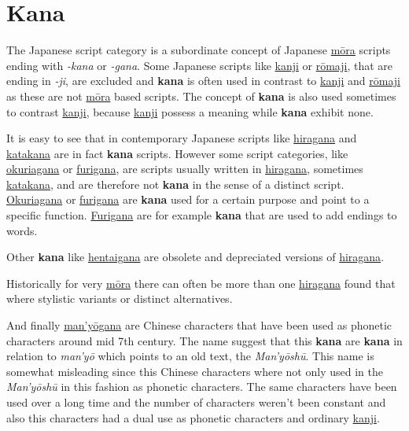 \section{Kana}
\label{sec:Kana}


The Japanese script category \lkana{} is a subordinate concept of Japanese
\hyperref[sec:Mora]{mōra} scripts ending with \textit{-kana} or \textit{-gana}.
Some Japanese scripts like \hyperref[sec:Kanji]{kanji} or
\hyperref[sec:Romaji]{rōmaji}, that are ending in \textit{-ji}, are excluded
and \textbf{kana} is often used in contrast to \hyperref[sec:Kanji]{kanji} and
\hyperref[sec:Romaji]{rōmaji} as these are not \hyperref[sec:Mora]{mōra} based
scripts. The concept of \textbf{kana} is also used sometimes to contrast
\hyperref[sec:Kanji]{kanji}, because \hyperref[sec:Kanji]{kanji} possess a
meaning while \textbf{kana} exhibit none.

It is easy to see that in contemporary Japanese scripts like
\hyperref[sec:Hiragana]{hiragana} and \hyperref[sec:Katakana]{katakana} are in
fact \textbf{kana} scripts. However some script categories, like
\hyperref[sec:Okurigana]{okuriagana} or \hyperref[sec:Furigana]{furigana}, are
scripts usually written in \hyperref[sec:Hiragana]{hiragana}, sometimes
\hyperref[sec:Katakana]{katakana}, and are therefore not \textbf{kana} in the
sense of a distinct script. \hyperref[sec:Okurigana]{Okuriagana} or
\hyperref[sec:Furigana]{furigana} are \textbf{kana} used for a certain purpose
and point to a specific function. \hyperref[sec:Furigana]{Furigana} are for
example \textbf{kana} that are used to add endings to words.

Other \textbf{kana} like \hyperref[sec:Hentaigana]{hentaigana} are obsolete and
depreciated versions of \hyperref[sec:Hiragana]{hiragana}.

Historically for very \hyperref[sec:Mora]{mōra} there can often be more than
one \hyperref[sec:Hiragana]{hiragana} found that where stylistic variants or
distinct alternatives.

And finally \hyperref[sec:Manyogana]{man'yōgana} are Chinese characters that
have been used as phonetic characters around mid 7th century. The name suggest
that this \textbf{kana} are \textbf{kana} in relation to \textit{man'yō} which
points to an old text, the \textit{Man'yōshū}. This name is somewhat misleading
since this Chinese characters where not only used in the \textit{Man'yōshū} in
this fashion as phonetic characters. The same characters have been used over a
long time and the number of characters weren't been constant and also this
characters had a dual use as phonetic characters and ordinary
\hyperref[sec:Kanji]{kanji}.

